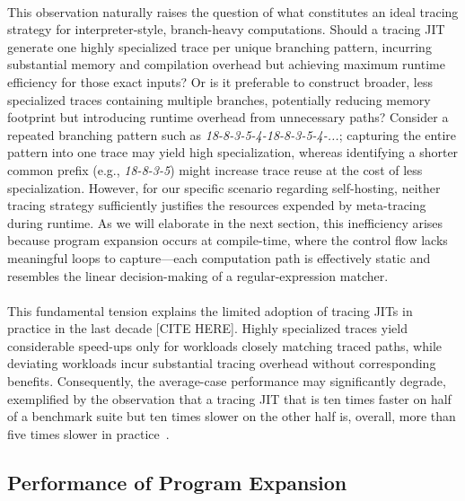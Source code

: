 			\paragraph{}%
				This observation naturally raises the question of what constitutes an ideal tracing strategy for interpreter-style, branch-heavy computations. Should a tracing JIT generate one highly specialized trace per unique branching pattern, incurring substantial memory and compilation overhead but achieving maximum runtime efficiency for those exact inputs? Or is it preferable to construct broader, less specialized traces containing multiple branches, potentially reducing memory footprint but introducing runtime overhead from unnecessary paths? Consider a repeated branching pattern such as \emph{18-8-3-5-4-18-8-3-5-4-...}; capturing the entire pattern into one trace may yield high specialization, whereas identifying a shorter common prefix (e.g., \emph{18-8-3-5}) might increase trace reuse at the cost of less specialization. However, for our specific scenario regarding self-hosting, neither tracing strategy sufficiently justifies the resources expended by meta-tracing during runtime. As we will elaborate in the next section, this inefficiency arises because program expansion occurs at compile-time, where the control flow lacks meaningful loops to capture—each computation path is effectively static and resembles the linear decision-making of a regular-expression matcher.


			\paragraph{}%
				This fundamental tension explains the limited adoption of tracing JITs in practice in the last decade [CITE HERE]. Highly specialized traces yield considerable speed-ups only for workloads closely matching traced paths, while deviating workloads incur substantial tracing overhead without corresponding benefits. Consequently, the average-case performance may significantly degrade, exemplified by the observation that a tracing JIT that is ten times faster on half of a benchmark suite but ten times slower on the other half is, overall, more than five times slower in practice~\cite{mozblog}.

		\subsection{Performance of Program Expansion}
			\label{section:there-is-no-loop}

